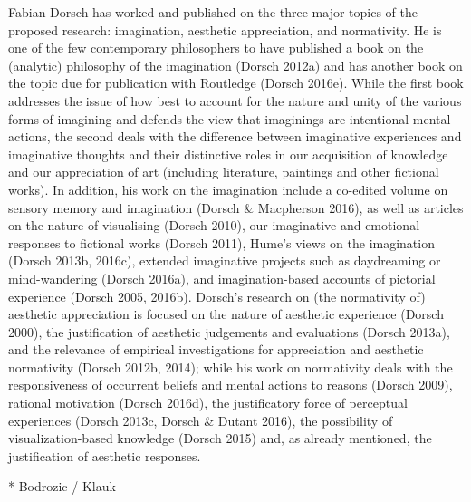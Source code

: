 \vspace{.2cm}
\noindent Fabian Dorsch has worked and published on the three major topics of the proposed research: imagination, aesthetic appreciation, and normativity. He is one of the few contemporary philosophers to have published a book on the (analytic) philosophy of the imagination (Dorsch 2012a) and has another book on the topic due for publication with Routledge (Dorsch 2016e). While the first book addresses the issue of how best to account for the nature and unity of the various forms of imagining and defends the view that imaginings are intentional mental actions, the second deals with the difference between imaginative experiences and imaginative thoughts and their distinctive roles in our acquisition of knowledge and our appreciation of art (including literature, paintings and other fictional works). In addition, his work on the imagination include a co-edited volume on sensory memory and imagination (Dorsch \& Macpherson 2016), as well as articles on the nature of visualising (Dorsch 2010), our imaginative and emotional responses to fictional works (Dorsch 2011), Hume's views on the imagination (Dorsch 2013b, 2016c), extended imaginative projects such as daydreaming or mind-wandering (Dorsch 2016a), and imagination-based accounts of pictorial experience (Dorsch 2005, 2016b). Dorsch's research on (the normativity of) aesthetic appreciation is focused on the nature of aesthetic experience (Dorsch 2000), the justification of aesthetic judgements and evaluations (Dorsch 2013a), and the relevance of empirical investigations for appreciation and aesthetic normativity (Dorsch 2012b, 2014); while his work on normativity deals with the responsiveness of occurrent beliefs and mental actions to reasons (Dorsch 2009), rational motivation (Dorsch 2016d), the justificatory force of perceptual experiences (Dorsch 2013c, Dorsch \& Dutant 2016), the possibility of visualization-based knowledge (Dorsch 2015) and, as already mentioned, the justification of aesthetic responses.

* Bodrozic / Klauk